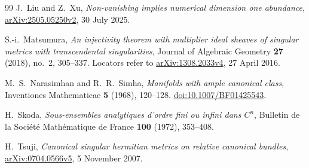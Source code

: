 \begin{thebibliography}{99}
J.~Liu and Z.~Xu,
\emph{Non-vanishing implies numerical dimension one abundance},
\href{https://arxiv.org/abs/2505.05250v2}{arXiv:2505.05250v2},
30 July 2025.

S.-i.~Matsumura,
\emph{An injectivity theorem with multiplier ideal sheaves of singular metrics with transcendental singularities},
Journal of Algebraic Geometry \textbf{27} (2018), no.~2, 305--337.
Locators refer to \href{https://arxiv.org/abs/1308.2033v4}{arXiv:1308.2033v4},
27 April 2016.

M.~S.~Narasimhan and R.~R.~Simha,
\emph{Manifolds with ample canonical class},
Inventiones Mathematicae \textbf{5} (1968), 120--128.
\href{https://doi.org/10.1007/BF01425543}{doi:10.1007/BF01425543}.

H.~Skoda,
\emph{Sous-ensembles analytiques d'ordre fini ou infini dans $C^n$},
Bulletin de la Soci\'et\'e Math\'ematique de France \textbf{100} (1972), 353--408.

H.~Tsuji,
\emph{Canonical singular hermitian metrics on relative canonical bundles},
\href{https://arxiv.org/abs/0704.0566v5}{arXiv:0704.0566v5},
5 November 2007.

\end{thebibliography}
